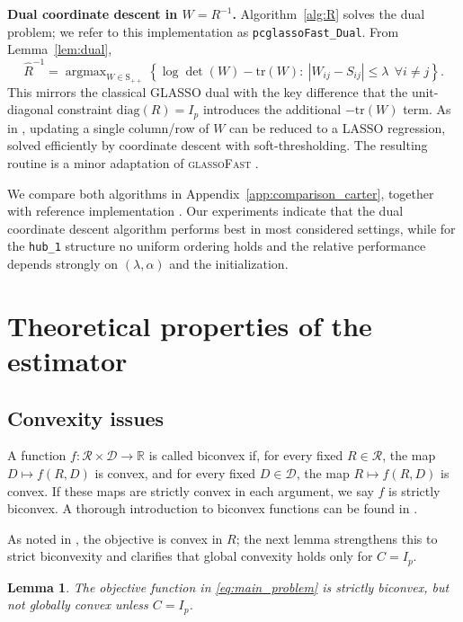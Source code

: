 \documentclass[12pt]{amsart}
\numberwithin{equation}{section}
\numberwithin{equation}{section}
\theoremstyle{plain}
\newtheorem{lemma}{Lemma}
\theoremstyle{definition}
\DeclareMathOperator*{\argmax}{\arg\max}
\newcommand{\tr}{\mathrm{tr}}
\newcommand{\diag}[1]{\mathrm{diag}(#1)}
\newcommand{\Spp}{\mathrm{S}_{++}}
\newcommand{\R}{\mathbb{R}}
\begin{document}
\textbf{Dual coordinate descent in $W=R^{-1}$.}
Algorithm~\ref{alg:R} solves the dual problem; we refer to this implementation as \texttt{pcglassoFast\_Dual}. From Lemma~\ref{lem:dual},
\[
\hat{R}^{-1}=\argmax_{W\in\Spp}
\left\{\log\det(W)-\tr(W):\ |W_{ij}-S_{ij}|\le\lambda\ \ \forall i\neq j\right\}.
\]
This mirrors the classical GLASSO dual with the key difference that the unit-diagonal constraint $\diag{R}=I_p$ introduces the additional
$-\tr(W)$ term. As in \cite{Banerjee,friedman2008sparse}, updating a single column/row of $W$ can be reduced
to a LASSO regression, solved efficiently by coordinate descent with soft-thresholding. The resulting routine
is a minor adaptation of \textsc{glassoFast} \cite{glassoFAST}.

We compare both algorithms in Appendix~\ref{app:comparison_carter}, together with reference implementation \cite{carter_arxiv_2025}. Our experiments indicate that the dual coordinate descent algorithm performs best in most considered settings, while for the \texttt{hub\_1} structure no uniform ordering holds and the relative performance depends strongly on $(\lambda,\alpha)$ and the initialization.



\section{Theoretical properties of the estimator}\label{sec:prop}

\subsection{Convexity issues}\label{sec:conv}

A function $f\colon \mathcal{R}\times\mathcal{D}\to \R$ is called biconvex if, for every fixed $R\in\mathcal{R}$, the map $D\mapsto f(R,D)$ is convex, and for every fixed $D\in\mathcal{D}$, the map $R\mapsto f(R,D)$ is convex. If these maps are strictly convex in each argument, we say $f$ is strictly biconvex. A thorough introduction to biconvex functions can be found in \cite{biconvex}. 

As noted in \cite[Proposition 4]{Carter}, the objective is convex in $R$; the next lemma strengthens this to strict biconvexity and clarifies that global convexity holds only for $C=I_p$. 
\begin{lemma}\label{lem:biconvex}
    The objective function in \eqref{eq:main_problem} is strictly biconvex, but not globally convex unless $C=I_p$. 
\end{lemma}
\end{document}
